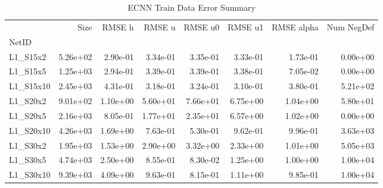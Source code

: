 \documentclass{article}
\theoremstyle{remark}
\numberwithin{equation}{subsection}
\begin{document}
\begin{table}[H]
\begin{tabular}{lrrrrrrr}
	\toprule
	{} &     Size &   RMSE h &   RMSE u &  RMSE u0 &  RMSE u1 &  RMSE alpha &  Num NegDef \\
	NetID     &          &          &          &          &          &             &             \\
	\midrule
	L1\_S15x2  & 5.26e+02 & 2.90e-01 & 3.34e-01 & 3.35e-01 & 3.33e-01 &    1.73e-01 &    0.00e+00 \\
	L1\_S15x5  & 1.25e+03 & 2.94e-01 & 3.39e-01 & 3.39e-01 & 3.38e-01 &    7.05e-02 &    0.00e+00 \\
	L1\_S15x10 & 2.45e+03 & 4.31e-01 & 3.18e-01 & 3.24e-01 & 3.10e-01 &    3.80e-01 &    5.21e+02 \\
	L1\_S20x2  & 9.01e+02 & 1.10e+00 & 5.60e+01 & 7.66e+01 & 6.75e+00 &    1.04e+00 &    5.80e+01 \\
	L1\_S20x5  & 2.16e+03 & 8.05e-01 & 1.77e+01 & 2.35e+01 & 6.57e+00 &    1.02e+00 &    0.00e+00 \\
	L1\_S20x10 & 4.26e+03 & 1.69e+00 & 7.63e-01 & 5.30e-01 & 9.62e-01 &    9.96e-01 &    3.63e+03 \\
	L1\_S30x2  & 1.95e+03 & 1.53e+00 & 2.90e+00 & 3.32e+00 & 2.33e+00 &    1.01e+00 &    5.05e+03 \\
	L1\_S30x5  & 4.74e+03 & 2.50e+00 & 8.55e-01 & 8.30e-02 & 1.25e+00 &    1.00e+00 &    1.00e+04 \\
	L1\_S30x10 & 9.39e+03 & 4.09e+00 & 9.63e-01 & 8.15e-01 & 1.11e+00 &    9.85e-01 &    1.00e+04 \\
	\bottomrule
\end{tabular}

\caption{ECNN Train Data Error Summary}
\end{table}
\end{document}
